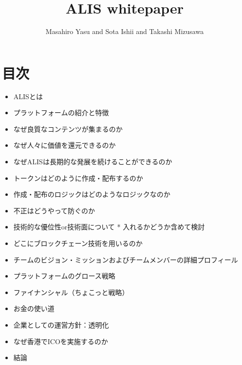 \documentclass{jsarticle}
\begin{document}
\title{ALIS whitepaper}
\author{Masahiro Yasu and Sota Ishii and Takashi Mizusawa}
\maketitle

\section{目次}
\begin{itemize}
	\item ALISとは
	\item プラットフォームの紹介と特徴
	\item なぜ良質なコンテンツが集まるのか
	\item なぜ人々に価値を還元できるのか
	\item なぜALISは長期的な発展を続けることができるのか
	\item トークンはどのように作成・配布するのか
	\item 作成・配布のロジックはどのようなロジックなのか
	\item 不正はどうやって防ぐのか
	\item 技術的な優位性or技術面について * 入れるかどうか含めて検討
	\item どこにブロックチェーン技術を用いるのか
	\item チームのビジョン・ミッションおよびチームメンバーの詳細プロフィール
	\item プラットフォームのグロース戦略
	\item ファイナンシャル（ちょこっと戦略）
	\item お金の使い道
	\item 企業としての運営方針：透明化
	\item なぜ香港でICOを実施するのか
	\item 結論
\end{itemize}
\end{document}
